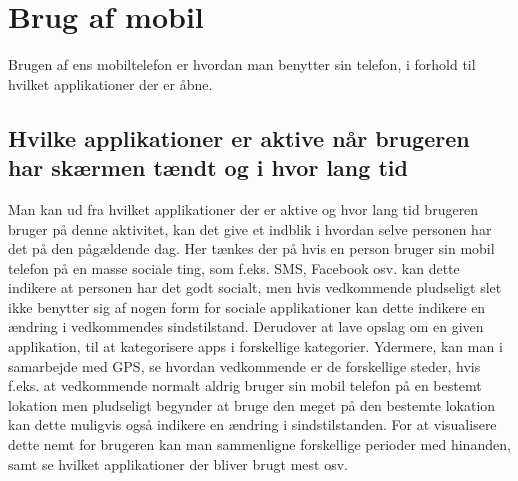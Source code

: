 \section{Brug af mobil}
Brugen af ens mobiltelefon er hvordan man benytter sin telefon, i forhold til hvilket applikationer der er åbne.

\subsection{Hvilke applikationer er aktive når brugeren har skærmen tændt og i hvor lang tid}
Man kan ud fra hvilket applikationer der er aktive og hvor lang tid brugeren bruger på denne aktivitet, kan det give et indblik i hvordan selve personen har det på den pågældende dag.
Her tænkes der på hvis en person bruger sin mobil telefon på en masse sociale ting, som f.eks. SMS, Facebook osv. kan dette indikere at personen har det godt socialt, men hvis vedkommende pludseligt slet ikke benytter sig af nogen form for sociale applikationer kan dette indikere en ændring i vedkommendes sindstilstand.
Derudover at lave opslag om en given applikation, til at kategorisere apps i forskellige kategorier.
Ydermere, kan man i samarbejde med GPS, se hvordan vedkommende er de forskellige steder, hvis f.eks. at vedkommende normalt aldrig bruger sin mobil telefon på en bestemt lokation men pludseligt begynder at bruge den meget på den bestemte lokation kan dette muligvis også indikere en ændring i sindstilstanden.
For at visualisere dette nemt for brugeren kan man sammenligne forskellige perioder med hinanden, samt se hvilket applikationer der bliver brugt mest osv.


